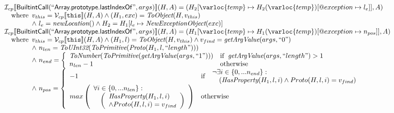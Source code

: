 \[
\begin{array}{l}
\I _{cp}\lbr \SF{BuiltintCall}(``\SF{Array.prototype.lastIndexOf}",args)\rbr(H,A)
 = (H_2[\varloc{temp}\mapsto H_2(\varloc{temp})[\varprop{exception}\mapsto l_e]], A) \\
\quad\wherec{
  v_{this} = \V _{cp}\lbr \TT{this}\rbr (H,A) \land (H_1,exc) = \hf{ToObject}(H,v_{this})\\
  \land\ l_e = \hf{newLocation}() \land H_2=H_1[l_e\mapsto\hf{NewExceptionObject}(exc)] 
  }\\
  
\I _{cp}\lbr \SF{BuiltintCall}(``\SF{Array.prototype.lastIndexOf}",args)\rbr(H,A)
 = (H_1[\varloc{temp}\mapsto H_1(\varloc{temp})[\varprop{exception}\mapsto n_{pos}]], A) \\
\quad\wherec{
  v_{this} = \V _{cp}\lbr \TT{this}\rbr (H,A) \land (H_1,l) = \hf{ToObject}(H,v_{this})
  \land v_{find} = \hf{getArgValue}(args,``0")\\
  \land\ n_{len} = \hf{ToUInt32}(\hf{ToPrimitive}(\hf{Proto}(H_1, l, ``length")))\\
  \land\ n_{end} = \left\{\begin{array}{ll}
      \hf{ToNumber}(\hf{ToPrimitive}(\hf{getArgValue}(args, ``1")))
      & \ifc{\hf{getArgValue}(args, ``length") > 1}\\
      n_{len}-1 & \owc\\
    \end{array}\right.\\
  \land\ n_{pos} = \left\{\begin{array}{ll}
      -1 & \ifc{\begin{array}{l}
        \neg\exists i \in \{0,...n_{end}\}:\\
        \quad(\hf{HasProperty}(H_1,l,i) \land Proto(H,l,i) = v_{find})\end{array}}\\
      max\left(\begin{array}{l}
        \forall i \in \{0,...n_{len}\}:\\
        \quad\left(\begin{array}{l}
          \hf{HasProperty}(H_1,l,i)\\
          \land Proto(H,l,i) = v_{find}\end{array}\right)\end{array}\right) & \owc
    \end{array}\right.\\
  }\\
\\\\

\end{array}
\]
